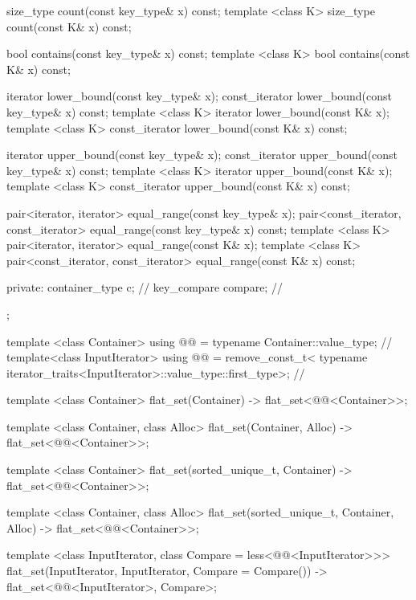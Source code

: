 \begin{codeblock}
\begin{codeblock}
\begin{codeblock}
\begin{addedblock}
\begin{codeblock}
{{    size_type count(const key_type& x) const;
    template <class K> size_type count(const K& x) const;

    bool contains(const key_type& x) const;
    template <class K> bool contains(const K& x) const;

    iterator lower_bound(const key_type& x);
    const_iterator lower_bound(const key_type& x) const;
    template <class K> iterator lower_bound(const K& x);
    template <class K> const_iterator lower_bound(const K& x) const;

    iterator upper_bound(const key_type& x);
    const_iterator upper_bound(const key_type& x) const;
    template <class K> iterator upper_bound(const K& x);
    template <class K> const_iterator upper_bound(const K& x) const;

    pair<iterator, iterator> equal_range(const key_type& x);
    pair<const_iterator, const_iterator> equal_range(const key_type& x) const;
    template <class K>
      pair<iterator, iterator> equal_range(const K& x);
    template <class K>
      pair<const_iterator, const_iterator> equal_range(const K& x) const;

  private:
      container_type c;    // \expos
      key_compare compare; // \expos
  };

  template <class Container>
    using @@ = typename Container::value_type; // \expos
  template<class InputIterator>
    using @@ = remove_const_t<
      typename iterator_traits<InputIterator>::value_type::first_type>;     // \expos

  template <class Container>
    flat_set(Container)
      -> flat_set<@@<Container>>;

  template <class Container, class Alloc>
    flat_set(Container, Alloc)
      -> flat_set<@@<Container>>;

  template <class Container>
    flat_set(sorted_unique_t, Container)
      -> flat_set<@@<Container>>;

  template <class Container, class Alloc>
    flat_set(sorted_unique_t, Container, Alloc)
      -> flat_set<@@<Container>>;

  template <class InputIterator, class Compare = less<@@<InputIterator>>>
    flat_set(InputIterator, InputIterator, Compare = Compare())
      -> flat_set<@@<InputIterator>, Compare>;

}
\end{codeblock}
\end{addedblock}
\end{codeblock}
\end{codeblock}
\end{codeblock}
